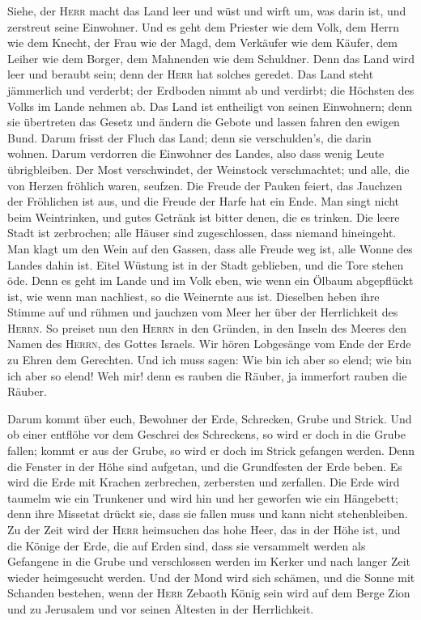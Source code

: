  Siehe, der \textsc{Herr} macht das Land leer und wüst und
wirft um, was darin ist, und zerstreut seine Einwohner. 
Und es geht dem Priester wie dem Volk, dem Herrn wie dem Knecht, der
Frau wie der Magd, dem Verkäufer wie dem Käufer, dem Leiher wie dem
Borger, dem Mahnenden wie dem Schuldner.  Denn das Land
wird leer und beraubt sein; denn der \textsc{Herr} hat solches geredet.
 Das Land steht jämmerlich und verderbt; der Erdboden
nimmt ab und verdirbt; die Höchsten des Volks im Lande nehmen ab.
 Das Land ist entheiligt von seinen Einwohnern; denn sie
übertreten das Gesetz und ändern die Gebote und lassen fahren den ewigen
Bund.  Darum frisst der Fluch das Land; denn sie
verschulden's, die darin wohnen. Darum verdorren die Einwohner des
Landes, also dass wenig Leute übrigbleiben.  Der Most
verschwindet, der Weinstock verschmachtet; und alle, die von Herzen
fröhlich waren, seufzen.  Die Freude der Pauken feiert,
das Jauchzen der Fröhlichen ist aus, und die Freude der Harfe hat ein
Ende.  Man singt nicht beim Weintrinken, und gutes Getränk
ist bitter denen, die es trinken.  Die leere Stadt ist
zerbrochen; alle Häuser sind zugeschlossen, dass niemand hineingeht.
 Man klagt um den Wein auf den Gassen, dass alle Freude
weg ist, alle Wonne des Landes dahin ist.  Eitel Wüstung
ist in der Stadt geblieben, und die Tore stehen öde. 
Denn es geht im Lande und im Volk eben, wie wenn ein Ölbaum abgepflückt
ist, wie wenn man nachliest, so die Weinernte aus ist. 
Dieselben heben ihre Stimme auf und rühmen und jauchzen vom Meer her
über der Herrlichkeit des \textsc{Herrn}.  So preiset nun
den \textsc{Herrn} in den Gründen, in den Inseln des Meeres den Namen
des \textsc{Herrn}, des Gottes Israels.  Wir hören
Lobgesänge vom Ende der Erde zu Ehren dem Gerechten. Und ich muss sagen:
Wie bin ich aber so elend; wie bin ich aber so elend! Weh mir! denn es
rauben die Räuber, ja immerfort rauben die Räuber.

 Darum kommt über euch, Bewohner der Erde, Schrecken,
Grube und Strick.  Und ob einer entflöhe vor dem Geschrei
des Schreckens, so wird er doch in die Grube fallen; kommt er aus der
Grube, so wird er doch im Strick gefangen werden. Denn die Fenster in
der Höhe sind aufgetan, und die Grundfesten der Erde beben.
 Es wird die Erde mit Krachen zerbrechen, zerbersten und
zerfallen.  Die Erde wird taumelm wie ein Trunkener und
wird hin und her geworfen wie ein Hängebett; denn ihre Missetat drückt
sie, dass sie fallen muss und kann nicht stehenbleiben. 
Zu der Zeit wird der \textsc{Herr} heimsuchen das hohe Heer, das in der
Höhe ist, und die Könige der Erde, die auf Erden sind, 
dass sie versammelt werden als Gefangene in die Grube und verschlossen
werden im Kerker und nach langer Zeit wieder heimgesucht werden.
 Und der Mond wird sich schämen, und die Sonne mit
Schanden bestehen, wenn der \textsc{Herr} Zebaoth König sein wird auf
dem Berge Zion und zu Jerusalem und vor seinen Ältesten in der
Herrlichkeit.

